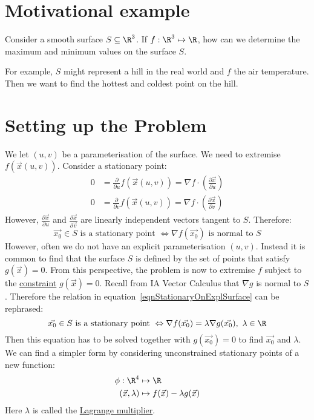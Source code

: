 \documentclass[../Main.tex]{subfiles}
\begin{document}
\section{Motivational example}
Consider a smooth surface $S \subseteq \R^3$. If $f : \R^3 \mapsto \R$, how can we determine the maximum and minimum values on the surface $S$.

For example, $S$ might represent a hill in the real world and $f$ the air temperature. Then we want to find the hottest and coldest point on the hill.
\section{Setting up the Problem}
We let $(u, v)$ be a parameterisation of the surface. We need to extremise $f(\vec{x}(u, v))$. Consider a stationary point:
\begin{align*}
    0 &= \frac{\partial}{\partial u} f(\vec{x}(u, v)) = \nabla f \cdot \left(\frac{\partial \vec{x}}{\partial u}\right) \\
    0 &= \frac{\partial}{\partial v} f(\vec{x}(u, v)) = \nabla f \cdot \left(\frac{\partial \vec{x}}{\partial v}\right)
\end{align*}
However, $\frac{\partial \vec{x}}{\partial u}$ and $\frac{\partial \vec{x}}{\partial \vec{v}}$ are linearly independent vectors tangent to $S$. Therefore:
\begin{equation}
    \vec{x_0} \in S \text{ is a stationary point } \Leftrightarrow \nabla f(\vec{x_0}) \text{ is normal to } S
    \label{eqnStationaryOnExplSurface}
\end{equation}
However, often we do not have an explicit parameterisation $(u, v)$. Instead it is common to find that the surface $S$ is defined by the set of points that satisfy $g(\vec{x}) = 0$. From this perspective, the problem is now to extremise $f$ subject to the \underline{constraint} $g(\vec{x}) = 0$. Recall from IA Vector Calculus that $\nabla g$ is normal to $S$. Therefore the relation in equation~\ref{eqnStationaryOnExplSurface} can be rephrased:
\begin{equation}
    \vec{x_0} \in S \text{ is a stationary point } \Leftrightarrow \nabla f(\vec{x_0}) = \lambda \nabla g(\vec{x_0}),~\lambda \in \R
    \label{eqnStationaryOnImplSurface}
\end{equation}
Then this equation has to be solved together with $g(\vec{x_0}) = 0$ to find $\vec{x_0}$ and $\lambda$. We can find a simpler form by considering unconstrained stationary points of a new function:
\begin{align*}
    \phi : \R^4 &\mapsto \R \\
    (\vec{x}, \lambda) &\mapsto f(\vec{x}) - \lambda g(\vec{x})
\end{align*}
Here $\lambda$ is called the \underline{Lagrange multiplier}.
\end{document}
